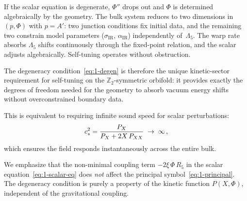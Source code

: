 If the scalar equation is degenerate, $\Phi''$ drops out and $\Phi$ is determined algebraically by the geometry. The bulk system reduces to two dimensions in $(p, \Phi)$ with $p = A'$: two junction conditions fix initial data, and the remaining two constrain model parameters ($\sigma_{\mathrm{IR}}$, $\alpha_{\mathrm{IR}}$) independently of~$\Lambda_5$. The warp rate absorbs $\Lambda_5$ shifts continuously through the fixed-point relation, and the scalar adjusts algebraically. Self-tuning operates without obstruction.

The degeneracy condition~\eqref{eq:1-degen} is therefore the unique kinetic-sector requirement for self-tuning on the $\mathbb{Z}_2$-symmetric orbifold: it provides exactly the degrees of freedom needed for the geometry to absorb vacuum energy shifts without overconstrained boundary data.

This is equivalent to requiring infinite sound speed for scalar perturbations:
\begin{equation}
\label{eq:1-cs-inf}
c_s^2 = \frac{P_X}{P_X + 2X\,P_{XX}} \;\to\; \infty\,,
\end{equation}
which ensures the field responds instantaneously across the entire bulk.

We emphasize that the non-minimal coupling term $-2\xi\,\Phi\, R_5$ in the scalar equation~\eqref{eq:1-scalar-eq} does \emph{not} affect the principal symbol~\eqref{eq:1-principal}. The degeneracy condition is purely a property of the kinetic function $P(X, \Phi)$, independent of the gravitational coupling.

